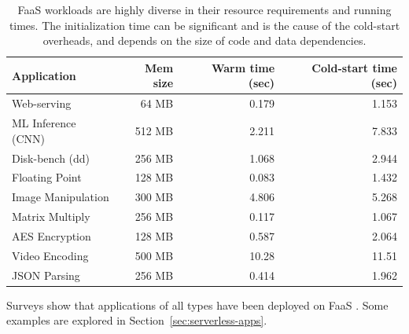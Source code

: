 \begin{table}
  \centering
  \caption{FaaS workloads are highly diverse in their resource requirements and running times. The initialization time can be significant and is the cause of the cold-start overheads, and depends on the size of code and data dependencies.}
  \begin{tabular}{lrrr}
    \hline 
    Application & Mem size & Warm time (sec) & Cold-start time (sec) \\
    \hline
    Web-serving & 64 MB & 0.179 & 1.153 \\  
    ML Inference (CNN) & 512 MB & 2.211 & 7.833 \\
    Disk-bench (dd) & 256 MB & 1.068 & 2.944 \\  
    Floating Point & 128 MB & 0.083 & 1.432 \\  
    Image Manipulation & 300 MB & 4.806 & 5.268 \\  
    Matrix Multiply & 256 MB & 0.117 & 1.067 \\  
    AES Encryption & 128 MB & 0.587 & 2.064 \\  
    Video Encoding & 500 MB & 10.28 & 11.51 \\  
    JSON Parsing & 256 MB & 0.414 & 1.962 \\
    \hline
  \end{tabular}
  \label{tab:workloads}
\end{table}

Surveys show that applications of all types have been deployed on FaaS \cite{raza2021sok,hossein2022survey,eismann2020serverless}.
Some examples are explored in Section~\ref{sec:serverless-apps}.


